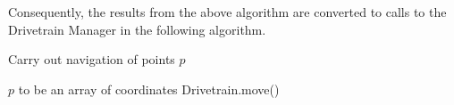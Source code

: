\documentclass{article}
\begin{document}
Consequently, the results from the above algorithm are converted to calls to the Drivetrain Manager in the following algorithm.

\begin{algorithm}
	\caption{Carry out navigation of points $p$}
	\begin{algorithmic}[1]
		\Require $p$ to be an array of coordinates
			\For{$i$ \textbf{in} $[1,\#p)$} 
				\State Drivetrain.move()
			\EndFor
		\EndProcedure
	\end{algorithmic}
\end{algorithm}
			
\end{document}
